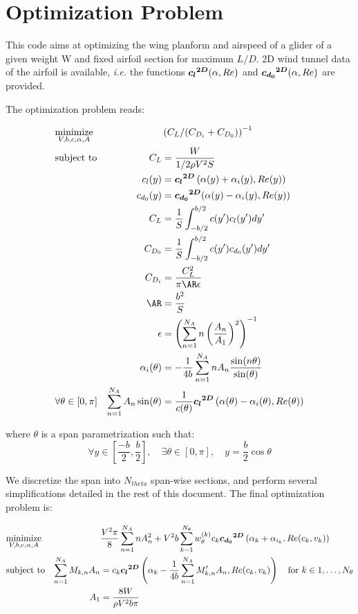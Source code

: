 \documentclass[letterpaper,12pt]{article}
\begin{document}
\section{Optimization Problem}

This code aims at optimizing the wing planform and airspeed of a glider of a given weight W and fixed airfoil section for maximum $L/D$.
2D wind tunnel data of the airfoil is available, {\it i.e.} the functions
$\boldsymbol{{c_l}^{2D}}(\alpha, Re)$ and 
$\boldsymbol{{c_{d_0}}^{2D}}(\alpha, Re)$ are provided.

The optimization problem reads:

\begin{align*}
	& \underset{V, b, c, \alpha, A}{\text{minimize}}
	& & \left( C_L / (C_{D_i} + C_{D_0})\right)^{-1} \nonumber \\
	& \text{subject to} 
	& C_L &= \frac{W}{1/2 \rho V^2 S} \\
	& & c_l(y) &= \cl \left( \alpha(y) + \alpha_i(y), Re(y)\right) \\
	& & c_{d_0}(y) &= \cd(\alpha(y) - \alpha_i(y), Re(y)) \\
	& & C_L &= \frac 1 S \int_{-b/2}^{b/2} c(y') c_l(y') dy'\\
	& & C_{D_0} &= \frac 1 S \int_{-b/2}^{b/2} c(y') c_{d_0}(y') dy'\\
	& & C_{D_i} & = \frac{C_L^2}{\pi \AR \epsilon} \\
	& & \AR &= \frac{b^2}{S} \\
	& & \epsilon &= \left(\sum_{n=1}^{N_A} n \left(\frac{A_n}{A_1}\right)^2 \right)^{-1} \\
	& & \alpha_i(\theta) &= -\frac 1 {4b} \sum_{n=1}^{N_A} n A_n\frac{\sin(n\theta)}{\sin(\theta)} \\
	& \forall \theta \in [0, \pi] & \sum_{n=1}^{N_A} A_n \sin(\theta) &= \frac{1}{
		c(\theta)} \cl \left( 
			\alpha(\theta) - \alpha_i(\theta), Re(\theta)
		\right) \\
\end{align*}

where $\theta$ is a span parametrization such that:
$$\forall y \in [\frac {-b} 2, \frac b 2], \quad \exists \theta \in [0,\pi], \quad y = \frac b 2 \cos\theta$$

We discretize the span into $N_{theta}$ span-wise sections, and perform several simplifications detailed in the rest of this document.
The final optimization problem is:

\begin{align*}
	& \underset{V, b, c, \alpha, A}{\text{minimize}}
	& & \frac{V^2 \pi}{8}\sum_{n=1}^{N_A} n A_{n}^2 +
	  V^2 b  \sum_{k=1}^{N_{\theta}} w_{\theta}^{(k)} c_k \boldsymbol{{c_{d_0}}^{2D}}\left( 
		\alpha_k +\alpha_{i_k}, Re(c_k, v_k)
		\right) \\
	& \text{subject to}
	&  \sum_{n=1}^{N_{A}} M_{k,n} A_n &=  c_k\boldsymbol{{c_l}^{2D}} \left( \alpha_k - \frac {1}{4b} 
		\sum_{n=1}^{N_{A}}M'_{k,n}A_n , Re(c_k, v_k)\right) \quad \text{for } k \in 1,\dots, N_{\theta} \\
	& &  A_1 &= \frac{8W}{\rho V^2 b \pi}\\
\end{align*}
\end{document}
